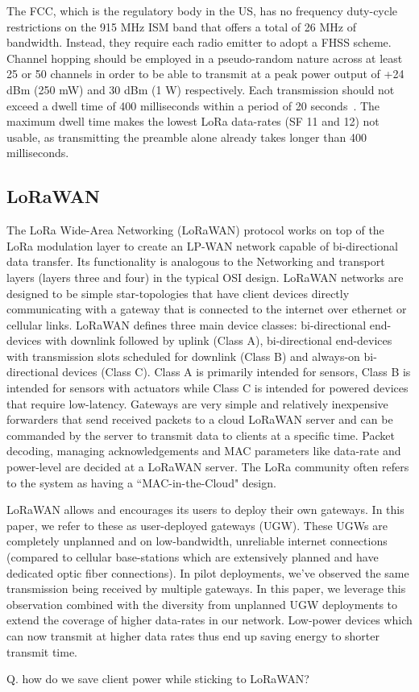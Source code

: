 The \ac{FCC}, which is the regulatory body in the \ac{US}, has no frequency
duty-cycle restrictions on the 915 MHz \ac{ISM} band that offers a total of 26
MHz of bandwidth. Instead, they require each radio emitter to adopt a
\ac{FHSS} scheme. Channel hopping should be employed in a pseudo-random nature
across at least 25 or 50 channels in order to be able to transmit at a peak
power output of +24 dBm (250 mW) and 30 dBm (1 W) respectively. Each
transmission should not exceed a dwell time of 400 milliseconds within a
period of 20 seconds~\cite{FCC15, FCCCompliance}. The maximum dwell time makes
the lowest \ac{LoRa} data-rates (\ac{SF} 11 and 12) not usable, as
transmitting the preamble alone already takes longer than 400 milliseconds.

\subsection{LoRaWAN}
\label{sec:lorawan}

The LoRa Wide-Area Networking (LoRaWAN) protocol works on top of the LoRa
modulation layer to create an LP-WAN network capable of bi-directional data
transfer. Its functionality is analogous to the Networking and transport
layers (layers three and four) in the typical OSI design. LoRaWAN networks
are designed to be simple star-topologies that have client devices directly
communicating with a gateway that is connected to the internet over ethernet
or cellular links. LoRaWAN defines three main device classes: bi-directional
end-devices with downlink followed by uplink (Class A), bi-directional
end-devices with transmission slots scheduled for downlink (Class B) and
always-on bi-directional devices (Class C). Class A is primarily intended for
sensors, Class B is intended for sensors with actuators while Class C is
intended for powered devices that require low-latency. Gateways are very
simple and relatively inexpensive forwarders that send received packets to a
cloud LoRaWAN server and can be commanded by the server to transmit data to
clients at a specific time. Packet decoding, managing acknowledgements and
MAC parameters like data-rate and power-level are decided at a LoRaWAN
server. The LoRa community often refers to the system as having a
``MAC-in-the-Cloud" design.

LoRaWAN allows and encourages its users to deploy their own gateways. In this
paper, we refer to these as user-deployed gateways (UGW). These UGWs are
completely unplanned and on low-bandwidth, unreliable internet connections
(compared to cellular base-stations which are extensively planned and have
dedicated optic fiber connections). In pilot deployments, we've observed the
same transmission being received by multiple gateways. In this paper, we
leverage this observation combined with the diversity from unplanned UGW
deployments to extend the coverage of higher data-rates in our network.
Low-power devices which can now transmit at higher data rates thus end up
saving energy to shorter transmit time.

{\color{blue}

Q. how do we save client power while sticking to LoRaWAN?
}